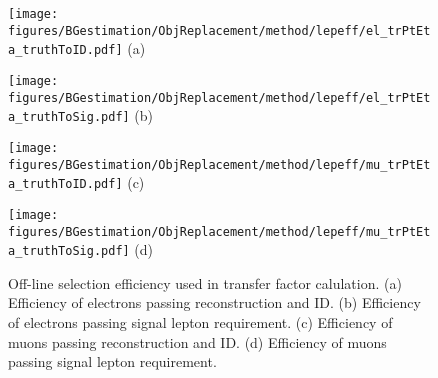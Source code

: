 \begin{figure}[htbp]
  \begin{center}
    \begin{minipage}[t]{.45\textwidth}
      \centering
      \texttt{[image: figures/BGestimation/ObjReplacement/method/lepeff/el\_trPtEta\_truthToID.pdf]}
      \hspace{10mm} (a)
      \label{fig::ObjReaplce::heff_mc_el_truthToID}
    \end{minipage}
    \begin{minipage}[t]{.45\textwidth}
      \centering
      \texttt{[image: figures/BGestimation/ObjReplacement/method/lepeff/el\_trPtEta\_truthToSig.pdf]}
      \hspace{10mm} (b)
      \label{fig::ObjReaplce::heff_mc_el_truthToSig}
    \end{minipage}
    \begin{minipage}[t]{.45\textwidth}
      \centering
      \texttt{[image: figures/BGestimation/ObjReplacement/method/lepeff/mu\_trPtEta\_truthToID.pdf]}
      \hspace{10mm} (c)
      \label{fig::ObjReaplce::heff_mc_mu_truthToID}
    \end{minipage}
    \begin{minipage}[t]{.45\textwidth}
      \centering
      \texttt{[image: figures/BGestimation/ObjReplacement/method/lepeff/mu\_trPtEta\_truthToSig.pdf]}
      \hspace{10mm} (d)
      \label{fig::ObjReaplce::heff_mc_mu_truthToSig}
    \end{minipage}
    \caption{Off-line selection efficiency used in transfer factor calulation. (a) Efficiency of electrons passing reconstruction and ID. (b) Efficiency of electrons passing signal lepton requirement.  (c) Efficiency of muons passing reconstruction and ID. (d) Efficiency of muons passing signal lepton requirement.}
    \label{fig::ObjReaplce::lep_efficiency}
  \end{center}
\end{figure}
